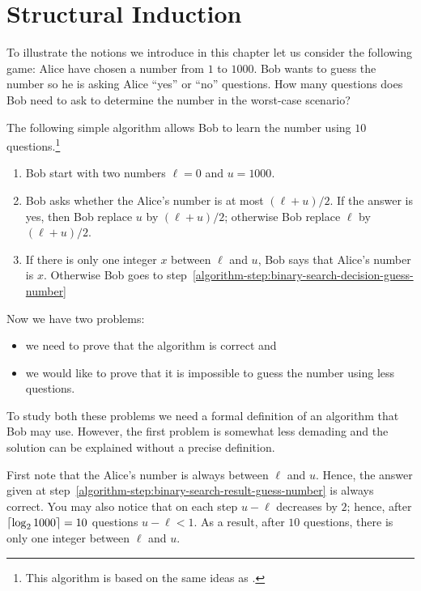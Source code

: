 \chapter{Structural Induction}
To illustrate the notions we introduce in this chapter let us consider the
following game: Alice have chosen a number from $1$ to $1000$. Bob wants to
guess the number so he is asking Alice ``yes'' or ``no'' questions.
How many questions does Bob need to ask to determine the number in the
worst-case scenario?

The following simple algorithm allows Bob to learn the number using $10$
questions.\footnote{%
  This algorithm is based on the same ideas as .
}
\begin{enumerate}
  \item Bob start with two numbers $\ell = 0$ and $u = 1000$.
  \item \label{algorithm-step:binary-search-decision-guess-number}
    Bob asks whether the Alice's number is at most $(\ell + u) / 2$.
    If the answer is yes, then Bob replace $u$ by $(\ell + u) / 2$;
    otherwise Bob replace $\ell$ by $(\ell + u) / 2$.
  \item \label{algorithm-step:binary-search-result-guess-number}
    If there is only one integer $x$ between $\ell$ and $u$, Bob
    says that Alice's number is $x$. Otherwise Bob goes to
    step~\ref{algorithm-step:binary-search-decision-guess-number}
\end{enumerate}

Now we have two problems:
\begin{itemize}
  \item we need to prove that the algorithm is correct and
  \item we would like to prove that it is impossible to guess the number
    using less questions.
\end{itemize}

To study both these problems we need a formal definition of an algorithm that
Bob may use. However, the first problem is somewhat less demading and
the solution can be explained without a precise definition.

First note that the Alice's number is always between $\ell$ and $u$. Hence,
the answer given at step~\ref{algorithm-step:binary-search-result-guess-number}
is always correct. You may also notice that on each step $u - \ell$
decreases by $2$; hence, after $\left\lceil {\log_2 1000} \right\rceil = 10$ questions $u - \ell < 1$.
As a result, after $10$ questions, there is only one integer between $\ell$ and
$u$.

